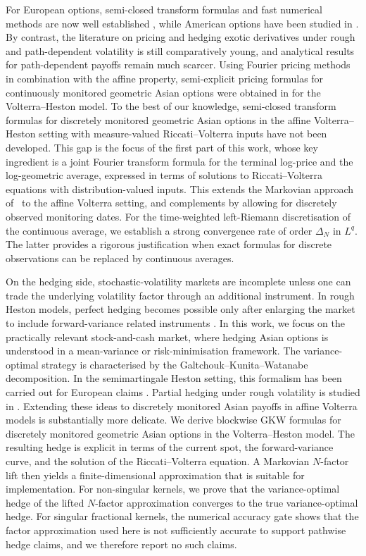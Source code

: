 \documentclass[10pt,a4paper,reqno]{amsart}
\theoremstyle{plain}
\theoremstyle{definition}
\theoremstyle{remark}
\theoremstyle{example}
\begin{document}
For European options, semi-closed transform formulas and fast numerical methods are now well established \cite{ElEuchRosenbaum2019}, while American options have been studied in \cite{chevalier2022american}. By contrast, the literature on pricing and hedging exotic derivatives under rough and path-dependent volatility is still comparatively young, and analytical results for path-dependent payoffs remain much scarcer. Using Fourier pricing methods in combination with the affine property, semi-explicit pricing formulas for continuously monitored geometric Asian options were obtained in \cite{aichinger2024pricing} for the Volterra--Heston model. To the best of our knowledge, semi-closed transform formulas for discretely monitored geometric Asian options in the affine Volterra--Heston setting with measure-valued Riccati--Volterra inputs have not been developed. This gap is the focus of the first part of this work, whose key ingredient is a joint Fourier transform formula for the terminal log-price and the log-geometric average, expressed in terms of solutions to Riccati--Volterra equations with distribution-valued inputs. This extends the Markovian approach of~\cite{KimWee2014} to the affine Volterra setting, and complements \cite{aichinger2024pricing} by allowing for discretely observed monitoring dates. For the time-weighted left-Riemann discretisation of the continuous average, we establish a strong convergence rate of order $\Delta_N$ in $L^q$. The latter provides a rigorous justification when exact formulas for discrete observations can be replaced by continuous averages.

On the hedging side, stochastic-volatility markets are incomplete unless one can trade the underlying volatility factor through an additional instrument. In rough Heston models, perfect hedging becomes possible only after enlarging the market to include forward-variance related instruments \cite{euch2018perfect}. In this work, we focus on the practically relevant stock-and-cash market, where hedging Asian options is understood in a mean-variance or risk-minimisation framework. The variance-optimal strategy is characterised by the Galtchouk--Kunita--Watanabe decomposition. In the semimartingale Heston setting, this formalism has been carried out for European claims \cite{Kallsen2010}. Partial hedging under rough volatility is studied in \cite{MEHD2023}. Extending these ideas to discretely monitored Asian payoffs in affine Volterra models is substantially more delicate. We derive blockwise GKW formulas for discretely monitored geometric Asian options in the Volterra--Heston model. The resulting hedge is explicit in terms of the current spot, the forward-variance curve, and the solution of the Riccati--Volterra equation. A Markovian $N$-factor lift then yields a finite-dimensional approximation that is suitable for implementation. For non-singular kernels, we prove that the variance-optimal hedge of the lifted $N$-factor approximation converges to the true variance-optimal hedge. For singular fractional kernels, the numerical accuracy gate shows that the factor approximation used here is not sufficiently accurate to support pathwise hedge claims, and we therefore report no such claims.
\end{document}
